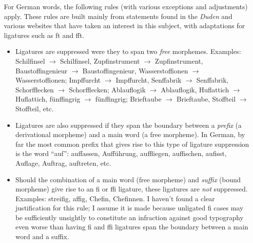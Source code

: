 \documentclass[11pt]{article}
\begin{document}
For German words, the following rules (with various exceptions and adjustments) apply. These rules are built mainly from statements found in the \emph{Duden} and various websites that have taken an interest in this subject, with adaptations for ligatures such as ft and fft.
\begin{itemize}
\item Ligatures are suppressed were they to span two \emph{free} morphemes. Examples: Schil\mbox{fi}nsel $\to$ Schilfinsel, Zup\mbox{fi}nstrument $\to$ Zupfinstrument, Bausto\mbox{ffi}ngenieur $\to$ Baustoffingenieur, Wassersto\mbox{ffi}onen $\to$ Wasserstoffionen; Imp\mbox{ff}urcht $\to$ Impffurcht, Sen\mbox{ff}abrik $\to$ Senffabrik, Schor\mbox{ffl}ecken $\to$ Schorfflecken; Ablau\mbox{fl}ogik $\to$ Ablauflogik, Hu\mbox{fl}attich $\to$ Huflattich, fün\mbox{ffi}ngrig $\to$ fünf\mbox{fi}ngrig; Brie\mbox{ft}aube $\to$ Brieftaube, Sto\mbox{fft}eil $\to$ Stoffteil, etc.


\item Ligatures are also suppressed if they span the boundary between a \emph{prefix} (a derivational morpheme) and a main word (a free morpheme). In German, by far the most common prefix that gives rise to this type of ligature suppression is the word \enquote{auf}: auffassen, Aufführung, auffliegen, auffischen, auf\breaklig iss\breaklig t, Auflage, Auftrag, auftreten, etc.

\item Should the combination of a main word (free morpheme) and \emph{suffix} (bound morpheme) give rise to an fi or ffi ligature, these ligatures are \emph{not} suppressed. Examples: streifig, affig, Chefin, Chefinnen. I haven't found a clear justification for this rule; I assume it is made because unligated f\breaklig i cases may be sufficiently unsightly to constitute an infraction against good typography even worse than having fi and ffi ligatures span the boundary between a main word and a suffix.



\end{itemize}
\end{document}

